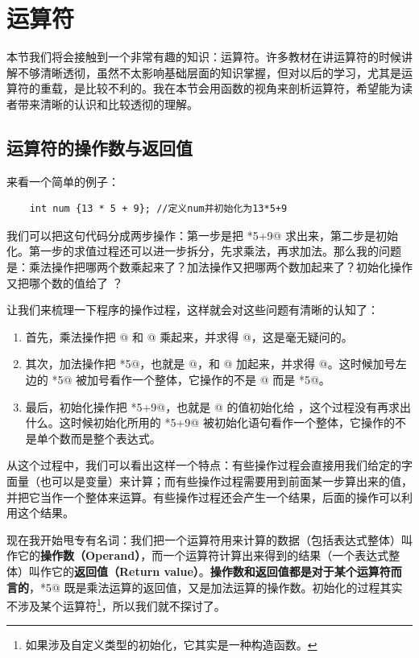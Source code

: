 \section{运算符}
本节我们将会接触到一个非常有趣的知识：运算符。许多教材在讲运算符的时候讲解不够清晰透彻，虽然不太影响基础层面的知识掌握，但对以后的学习，尤其是运算符的重载，是比较不利的。我在本节会用函数的视角来剖析运算符，希望能为读者带来清晰的认识和比较透彻的理解。\par
\subsection*{运算符的操作数与返回值}
来看一个简单的例子：
\begin{lstlisting}
    int num {13 * 5 + 9}; //定义num并初始化为13*5+9
\end{lstlisting}
我们可以把这句代码分成两步操作：第一步是把 *5+9@ 求出来，第二步是初始化。第一步的求值过程还可以进一步拆分，先求乘法，再求加法。那么我的问题是：乘法操作把哪两个数乘起来了？加法操作又把哪两个数加起来了？初始化操作又把哪个数的值给了 \lstinline@num@？\par
让我们来梳理一下程序的操作过程，这样就会对这些问题有清晰的认知了：
\begin{enumerate}
    \item 首先，乘法操作把 @ 和 @ 乘起来，并求得 @，这是毫无疑问的。
    \item 其次，加法操作把 *5@，也就是 @，和 @ 加起来，并求得 @。这时候加号左边的 *5@ 被加号看作一个整体，它操作的不是 @ 而是 *5@。
    \item 最后，初始化操作把 *5+9@，也就是 @ 的值初始化给 \lstinline@num@，这个过程没有再求出什么。这时候初始化所用的 *5+9@ 被初始化语句看作一个整体，它操作的不是单个数而是整个表达式。
\end{enumerate}\par
从这个过程中，我们可以看出这样一个特点：有些操作过程会直接用我们给定的字面量（也可以是变量）来计算；而有些操作过程需要用到前面某一步算出来的值，并把它当作一个整体来运算。有些操作过程还会产生一个结果，后面的操作可以利用这个结果。\par
现在我开始甩专有名词：我们把一个运算符用来计算的数据（包括表达式整体）叫作它的\textbf{操作数（Operand）}，而一个运算符计算出来得到的结果（一个表达式整体）叫作它的\textbf{返回值（Return value）}。\textbf{操作数和返回值都是对于某个运算符而言的}，*5@ 既是乘法运算的返回值，又是加法运算的操作数。初始化的过程其实不涉及某个运算符\footnote{如果涉及自定义类型的初始化，它其实是一种构造函数。}，所以我们就不探讨了。\par
